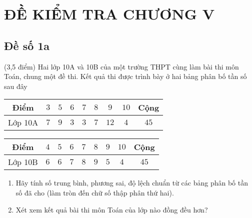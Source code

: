 \section{ĐỀ KIỂM TRA CHƯƠNG V}
\subsection{Đề số 1a}
\setcounter{bt}{0}
\begin{bt}%
	(3,5 điểm) Hai lớp 10A và 10B của một trường THPT cùng làm bài thi môn Toán, chung một đề thi. Kết quả thi được trình bày ở hai bảng phân bố tần số sau đây
	\begin{center}
		\begin{tabular}{|c|c|c|c|c|c|c|c|c|}
			\hline 
			Điểm & $3$ & $5$ & $6$ & $7$ & $8$ & $9$ & $10$ & Cộng \\ 
			\hline 
			Lớp 10A & $7$ & $9$ & $3$ & $3$ & $7$ & $12$ & $4$ & $45$ \\ 
			\hline 
		\end{tabular}
	\end{center}
	
	\begin{center}
		\begin{tabular}{|c|c|c|c|c|c|c|c|c|}
			\hline 
			Điểm & $4$ & $5$ & $6$ & $7$ & $8$ & $9$ & $10$ & Cộng \\ 
			\hline 
			Lớp 10B & $6$ & $6$ & $7$ & $8$ & $9$ & $5$ & $4$ & $45$ \\ 
			\hline 
		\end{tabular} 
	\end{center}
	\begin{enumerate}
		\item Hãy tính số trung bình, phương sai, độ lệch chuẩn từ các bảng phân bố tần số đã cho (làm tròn đến chữ số thập phân thứ hai).
		\item Xét xem kết quả bài thi môn Toán của lớp nào đồng đều hơn?
	\end{enumerate}
	
\end{bt}

